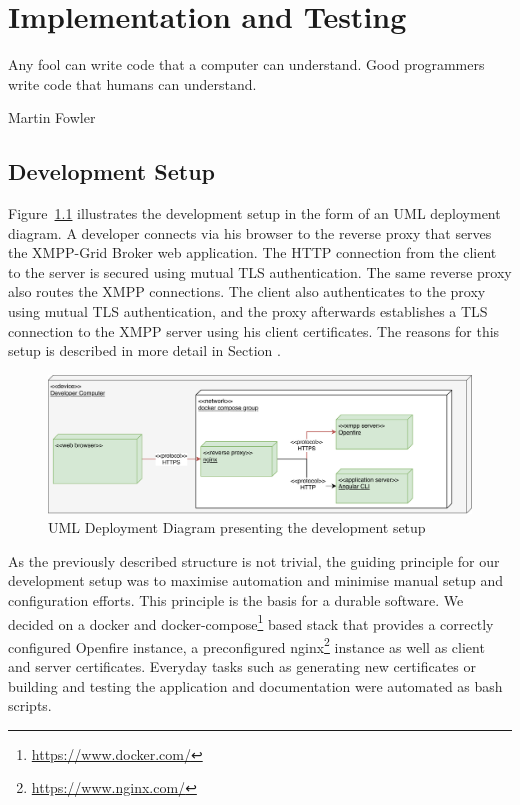 \chapter{Implementation and Testing} %
\epigraph{Any fool can write code that a computer can understand. Good programmers write code that humans can understand.}{Martin Fowler}


\section{Development Setup}

Figure~\ref{fig:development-setup} illustrates the development setup in the form of an UML deployment diagram.
A developer connects via his browser to the reverse proxy that serves the XMPP-Grid Broker web application.
The HTTP connection from the client to the server is secured using mutual TLS authentication.
The same reverse proxy also routes the XMPP connections.
The client also authenticates to the proxy using mutual TLS authentication, and the proxy afterwards establishes a TLS connection to the XMPP server using his client certificates.
The reasons for this setup is described in more detail in Section .

\begin{figure}[h]
    \centering
    \includegraphics[width=1\linewidth]{resources/development-setup-uml}
    \caption{UML Deployment Diagram presenting the development setup}
    \label{fig:development-setup}
\end{figure}

As the previously described structure is not trivial, the guiding principle for our development setup was to maximise automation and minimise manual setup and configuration efforts. This principle is the basis for a durable software.
We decided on a docker and docker-compose\footnote{\url{https://www.docker.com/}} based stack that provides a correctly configured Openfire instance, a preconfigured nginx\footnote{\url{https://www.nginx.com/}} instance as well as client and server certificates.
Everyday tasks such as generating new certificates or building and testing the application and documentation were automated as bash scripts.

